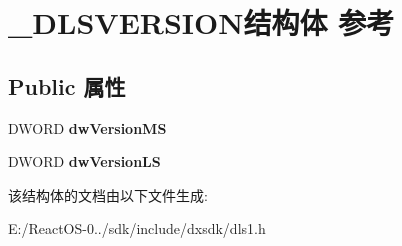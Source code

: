 \hypertarget{struct___d_l_s_v_e_r_s_i_o_n}{}\section{\+\_\+\+D\+L\+S\+V\+E\+R\+S\+I\+O\+N结构体 参考}
\label{struct___d_l_s_v_e_r_s_i_o_n}
\subsection*{Public 属性}
\begin{DoxyCompactItemize}
\item 
\mbox{\label{struct___d_l_s_v_e_r_s_i_o_n_a45d725b8e2faf44631550aa4091dca81}} 
D\+W\+O\+RD {\bfseries dw\+Version\+MS}
\item 
\mbox{\label{struct___d_l_s_v_e_r_s_i_o_n_ad6391490dc41a6a4d8863c743897e6b8}} 
D\+W\+O\+RD {\bfseries dw\+Version\+LS}
\end{DoxyCompactItemize}


该结构体的文档由以下文件生成\+:\begin{DoxyCompactItemize}
\item 
E\+:/\+React\+O\+S-\/0../sdk/include/dxsdk/dls1.\+h\end{DoxyCompactItemize}
